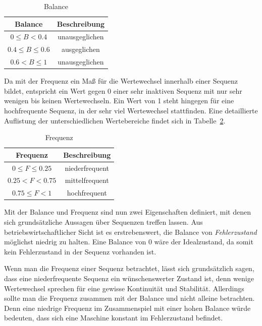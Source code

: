 \begin{table}[H]
	\begin{center}
		\begin{tabular}{|c c|}
			\hline
			Balance & Beschreibung \\
			\hline\hline
			$0 \leq B < 0.4$ & unausgeglichen \\ 
			\hline
			$0.4 \leq B \leq 0.6$ & ausgeglichen \\
			\hline
			$0.6 < B \leq 1$ & unausgeglichen \\
			\hline
		\end{tabular}
		\caption{Balance}
		\label{tab:properties-balance}
	\end{center}
\end{table}

Da mit der Frequenz ein Maß für die Wertewechsel innerhalb einer Sequenz bildet, entspricht ein Wert gegen 0 einer sehr inaktiven Sequenz mit nur sehr wenigen bis keinen Wertewechseln. Ein Wert von 1 steht hingegen für eine hochfrequente Sequenz, in der sehr viel Wertewechsel stattfinden. Eine detaillierte Auflistung der unterschiedlichen Wertebereiche findet sich in Tabelle~\ref{tab:properties-frequency}. 

\begin{table}[H]
	\begin{center}
		\begin{tabular}{|c c|} 
			\hline
			Frequenz & Beschreibung \\
			\hline\hline
			$0 \leq F \leq 0.25$ & niederfrequent \\ 
			\hline
			$0.25 < F < 0.75$ & mittelfrequent \\
			\hline
			$0.75 \leq F < 1$ & hochfrequent \\
			\hline
		\end{tabular}
		\caption{Frequenz}
		\label{tab:properties-frequency}
	\end{center}
\end{table}

Mit der Balance und Frequenz sind nun zwei Eigenschaften definiert, mit denen sich grundsätzliche Aussagen über Sequenzen treffen lassen. Aus betriebswirtschaftlicher Sicht ist es erstrebenswert, die Balance von \textit{Fehlerzustand} möglichst niedrig zu halten. Eine Balance von 0 wäre der Idealzustand, da somit kein Fehlerzustand in der Sequenz vorhanden ist. 

Wenn man die Frequenz einer Sequenz betrachtet, lässt sich grundsätzlich sagen, dass eine niederfrequente Sequenz ein wünschenswerter Zustand ist, denn wenige Wertewechsel sprechen für eine gewisse Kontinuität und Stabilität. Allerdings sollte man die Frequenz zusammen mit der Balance und nicht alleine betrachten. Denn eine niedrige Frequenz im Zusammenspiel mit einer hohen Balance würde bedeuten, dass sich eine Maschine konstant im Fehlerzustand befindet.

